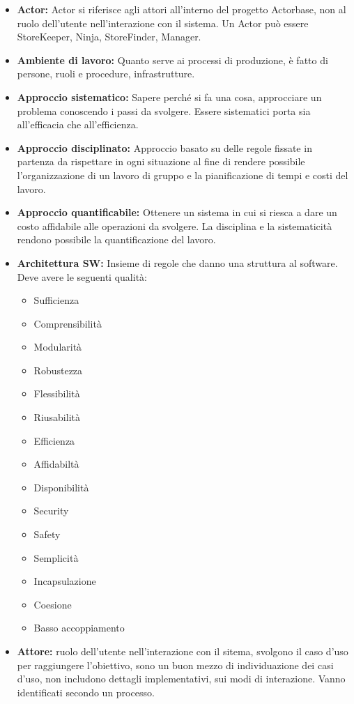 \documentclass[a4paper]{article}
\begin{document}
		\begin{itemize}
			\item \textbf{Actor:} Actor si riferisce agli attori all'interno del progetto Actorbase, 
			non al ruolo dell'utente nell'interazione con il sistema. Un Actor può essere StoreKeeper, 
			Ninja, StoreFinder, Manager.
			\item \textbf{Ambiente di lavoro:} Quanto serve ai processi di produzione, è fatto di persone, 
			ruoli e procedure, infrastrutture.
			\item \textbf{Approccio sistematico:} Sapere perché si fa una cosa, approcciare un problema 
			conoscendo i passi da svolgere. Essere sistematici porta sia all’efficacia che all’efficienza.
			\item \textbf{Approccio disciplinato:} Approccio basato su delle regole fissate in partenza da 
			rispettare in ogni situazione al fine di rendere possibile l’organizzazione di un lavoro di gruppo 
			e la pianificazione di tempi e costi del lavoro.
			\item \textbf{Approccio quantificabile:} Ottenere un sistema in cui si riesca a dare un costo 
			affidabile alle operazioni da svolgere. La disciplina e la sistematicità rendono possibile la 
			quantificazione del lavoro.
			\item \textbf{Architettura SW:} Insieme di regole che danno una struttura al software. Deve avere le seguenti qualità:
			\begin{itemize}
				\item  Sufficienza
				\item  Comprensibilità
				\item  Modularità
				\item  Robustezza 
				\item  Flessibilità
				\item  Riusabilità
				\item  Efficienza
				\item  Affidabiltà
				\item  Disponibilità
				\item  Security
				\item  Safety
				\item  Semplicità
				\item  Incapsulazione
				\item  Coesione
				\item  Basso accoppiamento
			\end{itemize}
			\item \textbf{Attore:}  ruolo dell'utente nell'interazione con il sitema, svolgono il caso d'uso per raggiungere l'obiettivo, 
			sono un buon mezzo di individuazione dei casi d'uso, non includono dettagli implementativi, sui modi di interazione. Vanno 
			identificati secondo un processo.
		\end{itemize}
		
\end{document}
